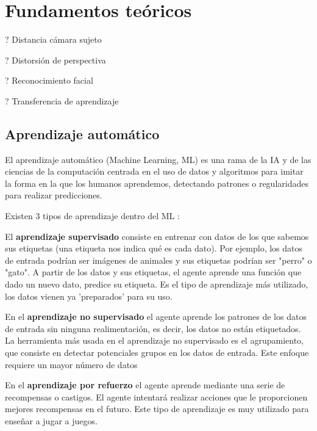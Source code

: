 \chapter{Fundamentos teóricos}
\thispagestyle{empty}

? Distancia cámara sujeto

? Distorsión de perspectiva

? Reconocimiento facial

? Transferencia de aprendizaje

\section{Aprendizaje automático}
El aprendizaje automático (Machine Learning, ML) \cite{16,17} es una rama de la IA y de las ciencias de la computación centrada en el uso de datos y algoritmos para imitar la forma en la que los humanos aprendemos, detectando patrones o regularidades para realizar predicciones.

Existen 3 tipos de aprendizaje dentro del ML \cite{18,19}:

El \textbf{aprendizaje supervisado} consiste en entrenar con datos de los que sabemos sus etiquetas (una etiqueta nos indica qué es cada dato). Por ejemplo, los datos de entrada podrían ser imágenes de animales y sus etiquetas podrían ser "perro" o "gato". A partir de los datos y sus etiquetas, el agente aprende una función que dado un nuevo dato, predice su etiqueta. Es el tipo de aprendizaje más utilizado, los datos vienen ya 'preparados' para su uso.

En el \textbf{aprendizaje no supervisado} el agente aprende los patrones de los datos de entrada sin ninguna realimentación, es decir, los datos no están etiquetados. La herramienta más usada en el aprendizaje no supervisado es el agrupamiento, que consiste en detectar potenciales grupos en los datos de entrada. Este enfoque requiere un mayor número de datos

En el \textbf{aprendizaje por refuerzo} el agente aprende mediante una serie de recompensas o castigos. El agente intentará realizar acciones que le proporcionen mejores recompensas en el futuro. Este tipo de aprendizaje es muy utilizado para enseñar a jugar a juegos.


